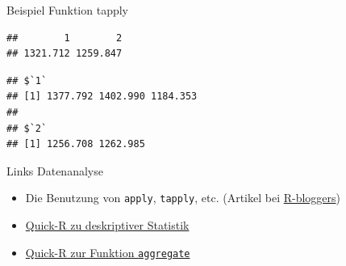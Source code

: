 \documentclass[
  ignorenonframetext,
]{beamer}
\newenvironment{Shaded}{\begin{snugshade}}{\end{snugshade}}
\newcommand{\ControlFlowTok}[1]{\textcolor[rgb]{0.26,0.66,0.93}{\textbf{#1}}}
\newcommand{\KeywordTok}[1]{\textcolor[rgb]{0.26,0.66,0.93}{\textbf{#1}}}
\newcommand{\NormalTok}[1]{\textcolor[rgb]{0.74,0.68,0.62}{#1}}
\newcommand{\OperatorTok}[1]{\textcolor[rgb]{0.74,0.68,0.62}{#1}}
\begin{document}
\begin{frame}[fragile]{Beispiel Funktion tapply}
\protect\hypertarget{beispiel-funktion-tapply}{}

\begin{Shaded}
\end{Shaded}

\begin{verbatim}
##        1        2 
## 1321.712 1259.847
\end{verbatim}

\begin{Shaded}
\end{Shaded}

\begin{verbatim}
## $`1`
## [1] 1377.792 1402.990 1184.353
## 
## $`2`
## [1] 1256.708 1262.985
\end{verbatim}

\end{frame}

\begin{frame}[fragile]{Links Datenanalyse}
\protect\hypertarget{links-datenanalyse}{}

\begin{itemize}
\item
  Die Benutzung von \texttt{apply}, \texttt{tapply}, etc. (Artikel bei
  \href{http://www.r-bloggers.com/using-apply-sapply-lapply-in-r/}{R-bloggers})
\item
  \href{http://www.statmethods.net/stats/descriptives.html}{Quick-R zu
  deskriptiver Statistik}
\item
  \href{http://www.statmethods.net/management/aggregate.html}{Quick-R
  zur Funktion \texttt{aggregate}}
\end{itemize}

\end{frame}
\end{document}
